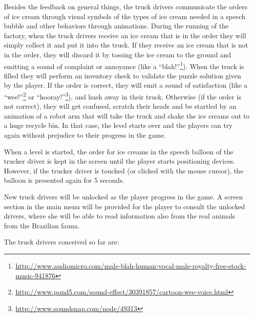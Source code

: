 \documentclass[a4paper]{scrartcl}
\begin{document}
            Besides the feedback on general things, the truck drivers
            communicate the orders of ice cream through visual symbols of the
            types of ice cream needed in a speech bubble and other behaviors
            through animations. During the running of the factory, when the
            truck drivers receive an ice cream that is in the order they will
            simply collect it and put it into the truck. If they receive an ice
            cream that is not in the order, they will discard it by tossing the
            ice cream to the ground and emitting a sound of complaint or
            annoyance (like a ``blah!''\footnote{\url{http://www.audiomicro.com/male-blah-human-vocal-male-royalty-free-stock-music-941876}}).
            When the truck is filled they will perform an inventory check to
            validate the puzzle solution given by the player. If the order is
            correct, they will emit a sound of satisfaction (like a
            ``wee!''\footnote{\url{http://www.pond5.com/sound-effect/30391857/cartoon-wee-voice.html}}
            or ``hooray!''\footnote{\url{http://www.soundsnap.com/node/49313}}),
            and hush away in their truck. Otherwise (if the order is not
            correct), they will get confused, scratch their heads and be
            startled by an animation of a robot arm that will take the truck and
            shake the ice creams out to a huge recycle bin. In that case, the
            level starts over and the players can try again without prejudice to
            their progress in the game.

            When a level is started, the order for ice creams in the speech
            balloon of the trucker driver is kept in the screen until the player
            starts positioning devices. However, if the trucker driver is
            touched (or clicked with the mouse cursor), the balloon is presented
            again for 5 seconds.

            New truck drivers will be unlocked as the player progress in the
            game. A screen section in the main menu will be provided for the
            player to consult the unlocked drivers, where she will be able to
            read information also from the real animals from the Brazilian fauna.

            The truck drivers conceived so far are:
\end{document}
